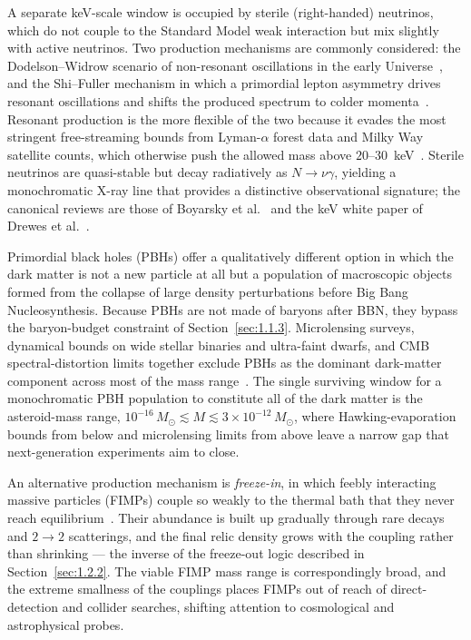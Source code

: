 A separate keV-scale window is occupied by sterile (right-handed) neutrinos, which do not couple to the Standard Model weak interaction but mix slightly with active neutrinos.
Two production mechanisms are commonly considered: the Dodelson--Widrow scenario of non-resonant oscillations in the early Universe~\cite{Dodelson:1993je}, and the Shi--Fuller mechanism in which a primordial lepton asymmetry drives resonant oscillations and shifts the produced spectrum to colder momenta~\cite{Shi:1998km}.
Resonant production is the more flexible of the two because it evades the most stringent free-streaming bounds from Lyman-$\alpha$ forest data and Milky Way satellite counts, which otherwise push the allowed mass above $20$--$30$~keV~\cite{Boyarsky:2018tvu}.
Sterile neutrinos are quasi-stable but decay radiatively as $N \to \nu\gamma$, yielding a monochromatic X-ray line that provides a distinctive observational signature; the canonical reviews are those of Boyarsky et al.~\cite{Boyarsky:2018tvu} and the keV white paper of Drewes et al.~\cite{Drewes:2016upu}.

Primordial black holes (PBHs) offer a qualitatively different option in which the dark matter is not a new particle at all but a population of macroscopic objects formed from the collapse of large density perturbations before Big Bang Nucleosynthesis.
Because PBHs are not made of baryons after BBN, they bypass the baryon-budget constraint of Section~\ref{sec:1.1.3}.
Microlensing surveys, dynamical bounds on wide stellar binaries and ultra-faint dwarfs, and CMB spectral-distortion limits together exclude PBHs as the dominant dark-matter component across most of the mass range~\cite{Carr:2020xqk}.
The single surviving window for a monochromatic PBH population to constitute all of the dark matter is the asteroid-mass range, $10^{-16}\,M_\odot \lesssim M \lesssim 3 \times 10^{-12}\,M_\odot$, where Hawking-evaporation bounds from below and microlensing limits from above leave a narrow gap that next-generation experiments aim to close.

An alternative production mechanism is \emph{freeze-in}, in which feebly interacting massive particles (FIMPs) couple so weakly to the thermal bath that they never reach equilibrium~\cite{Hall:2009bx}.
Their abundance is built up gradually through rare decays and $2 \to 2$ scatterings, and the final relic density grows with the coupling rather than shrinking --- the inverse of the freeze-out logic described in Section~\ref{sec:1.2.2}.
The viable FIMP mass range is correspondingly broad, and the extreme smallness of the couplings places FIMPs out of reach of direct-detection and collider searches, shifting attention to cosmological and astrophysical probes.

